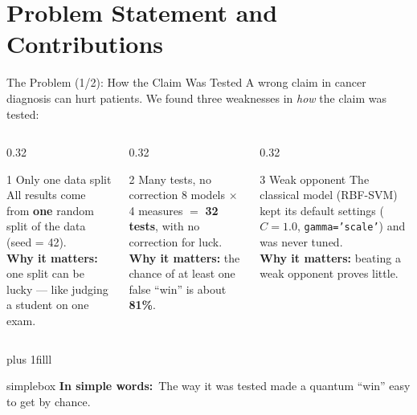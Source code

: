 \documentclass[aspectratio=169,11pt,t,xcolor={table}]{beamer}
\newcommand{\insimple}[1]{%
  \par\vskip 0pt plus 1filll
  \begin{beamercolorbox}[wd=\textwidth,sep=4pt,rounded=true]{simplebox}%
    \small\textbf{\textcolor{qamber!75!black}{In simple words:}}\ #1%
  \end{beamercolorbox}\vskip1pt}
\newcommand{\secquestion}{}
\begin{document}
\renewcommand{\secquestion}{What exactly is wrong, and what did we do about it?}
\section{Problem Statement and Contributions}

\begin{frame}{The Problem (1/2): How the Claim Was Tested}
  \small A wrong claim in cancer diagnosis can hurt patients. We found three weaknesses in \emph{how} the claim was tested:\par
  \vspace{3mm}
  \begin{columns}[T,onlytextwidth]
    \begin{column}{0.32\textwidth}
      \begin{block}{1 \textbullet{} Only one data split}
        \small
        All results come from \textbf{one} random split of the data (seed = 42).\\[4pt]
        \textbf{Why it matters:} one split can be lucky --- like judging a student on one exam.
      \end{block}
    \end{column}
    \begin{column}{0.32\textwidth}
      \begin{block}{2 \textbullet{} Many tests, no correction}
        \small
        8 models $\times$ 4 measures $=$ \textbf{32 tests}, with no correction for luck.\\[4pt]
        \textbf{Why it matters:} the chance of at least one false ``win'' is about \textbf{81\%}.
      \end{block}
    \end{column}
    \begin{column}{0.32\textwidth}
      \begin{block}{3 \textbullet{} Weak opponent}
        \small
        The classical model (RBF-SVM) kept its default settings ($C=1.0$, \texttt{gamma='scale'}) and was never tuned.\\[4pt]
        \textbf{Why it matters:} beating a weak opponent proves little.
      \end{block}
    \end{column}
  \end{columns}
  \insimple{The way it was tested made a quantum ``win'' easy to get by chance.}
\end{frame}
\end{document}

